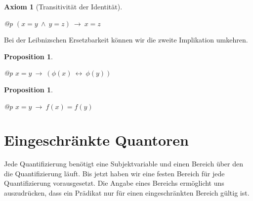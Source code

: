 \documentclass[a4paper,german,10pt,twoside]{book}
\newtheorem{prop}[thm]{Proposition}
\newtheorem{ax}{Axiom}
\theoremstyle{definition}
\theoremstyle{remark}
\begin{document}
\par


\begin{ax}[Transitivit{\"a}t der Identit{\"a}t]
\label{axiom:transitivityOfIdentity} \hypertarget{axiom:transitivityOfIdentity}{}
\mbox{}
\begin{longtable}{{@{\extracolsep{\fill}}p{\linewidth}}}
\centering $(x = y\ \land \ y = z)\ \rightarrow \ x = z$
\end{longtable}

\end{ax}




\par
Bei der Leibnizschen Ersetzbarkeit k{\"o}nnen wir die zweite Implikation umkehren.

\begin{prop}
\label{theorem:leibnizEquivalence} \hypertarget{theorem:leibnizEquivalence}{}
\mbox{}
\begin{longtable}{{@{\extracolsep{\fill}}p{\linewidth}}}
\centering $x = y\ \rightarrow \ (\phi(x)\ \leftrightarrow \ \phi(y))$
\end{longtable}

\end{prop}




\par


\begin{prop}
\label{theorem:identyImpliesFunctionalEquality} \hypertarget{theorem:identyImpliesFunctionalEquality}{}
\mbox{}
\begin{longtable}{{@{\extracolsep{\fill}}p{\linewidth}}}
\centering $x = y\ \rightarrow \ f(x) = f(y)$
\end{longtable}

\end{prop}




\section{Eingeschr{\"a}nkte Quantoren} \label{chapter6_section1} \hypertarget{chapter6_section1}{}
Jede Quantifizierung ben{\"o}tigt eine Subjektvariable und einen Bereich {\"u}ber den die Quantifizierung l{\"a}uft. Bis jetzt haben wir eine festen Bereich f{\"u}r jede Quantifizierung vorausgesetzt. Die Angabe eines Bereichs erm{\"o}glicht uns auszudr{\"u}cken, dass ein Pr{\"a}dikat nur f{\"u}r einen eingeschr{\"a}nkten Bereich g{\"u}ltig ist.
\end{document}
